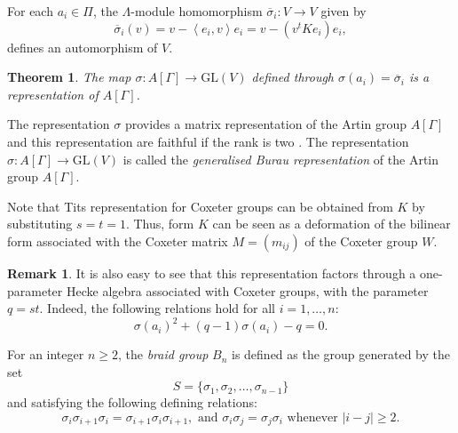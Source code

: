 \documentclass[12pt]{amsart}
\newtheorem{theorem}[equation]{Theorem}
\theoremstyle{definition}
\newtheorem{remark}[equation]{Remark}
\numberwithin{equation}{section}
\newcommand{\GL}{\mathrm{GL}}
\begin{document}
For each $a_i \in \Pi$, the $\Lambda$-module homomorphism $\overline{\sigma}_{i}: V \rightarrow V$ given by 
\begin{equation}\label{generalised burau representation formula}
\overline{\sigma}_{i}(v)=v-\left\langle e_i, v\right\rangle e_i = v - (v^tKe_i)e_i,
\end{equation}
defines an automorphism of $V$. 
\begin{theorem}\cite[Theorem 1]{MR0938643}
The map $\sigma: A[\Gamma] \to \GL(V)$ defined through $\sigma\left(a_i\right)=\overline{\sigma}_i$ is a representation of $A[\Gamma]$.
\end{theorem}
The representation $\sigma$ provides a matrix representation of the Artin group $A[\Gamma]$ and this representation are faithful if the rank is two \cite{MR0938643}. The  representation $\sigma: A[\Gamma]\rightarrow \GL(V)$ is called the {\it generalised Burau representation} of the Artin group $A[\Gamma]$.
\par
 Note that Tits representation for Coxeter groups can be obtained from $K$ by substituting $s=t=1$. Thus, form $K$  can be seen as a deformation of the bilinear form associated with the Coxeter matrix $M = (m_{i j} )$ of the Coxeter group $W$.

\begin{remark}
 It is also easy to see that this representation factors through a one-parameter Hecke algebra associated with Coxeter groups, with the parameter $q=st$. Indeed, the following relations hold for all $i = 1,\ldots,n$:
\begin{equation}\label{eq:hecke}
\sigma(a_i)^2 + (q-1)\sigma(a_i)-q =0.
\end{equation}
\end{remark}
For an integer $n \ge 2$, the \textit{braid group} $B_n$ is defined as the group generated by the set $$S = \{\sigma_1, \sigma_2, \dots, \sigma_{n-1}\}$$ and satisfying the following defining relations:
$$\sigma_i\sigma_{i+1}\sigma_i = \sigma_{i+1}\sigma_i\sigma_{i+1},  \text{ and } \sigma_i\sigma_j = \sigma_j\sigma_i \text{ whenever } |i-j| \geq 2 .$$

\medskip
\end{document}

